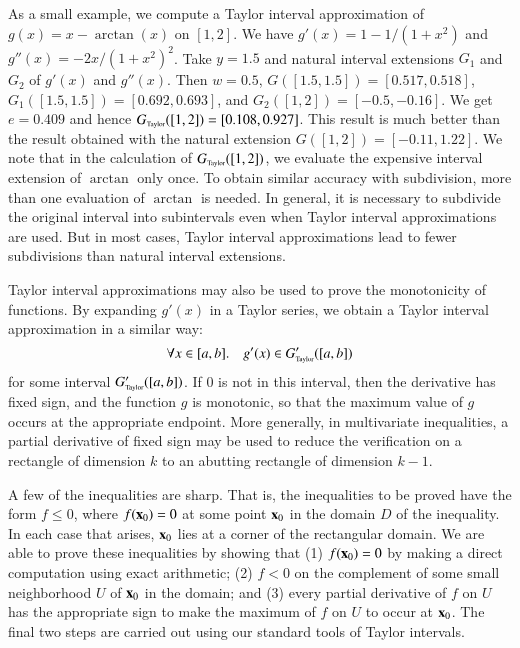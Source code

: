As a small example, we compute a Taylor interval approximation of
$g(x) = x - \arctan(x)$ on $[1,2]$. We have $g'(x) = 1 - {1}/{(1 + x^2)}$ and $g''(x)
= {-2x}/{(1 + x^2)^2}$. Take $y = 1.5$ and natural interval
extensions $G_1$ and $G_2$ of $g'(x)$ and $g''(x)$. Then $w = 0.5$,
$G([1.5,1.5]) = [0.517,0.518]$, $G_1([1.5,1.5]) = [0.692,0.693]$, and
$G_2([1,2]) = [-0.5, -0.16]$. We get $e = 0.409$ and hence $G_{\hbox{\tiny Taylor}}([1,2])
= [0.108, 0.927]$. This result is much better than the result obtained
with the natural extension $G([1,2]) = [-0.11, 1.22]$. 
We note that in the calculation of $G_{\hbox{\tiny Taylor}}([1,2])$, we evaluate the
expensive interval extension of $\arctan$ only once.  To obtain
similar accuracy with subdivision, more than one evaluation of $\arctan$
is needed.  In general, it is necessary to subdivide the original
interval into subintervals even when Taylor interval approximations are
used. But in most cases, Taylor interval approximations lead to fewer
subdivisions than natural interval extensions.

Taylor interval approximations may also be used to
prove the monotonicity of functions.  By expanding $g'(x)$ in a 
Taylor series, we obtain a Taylor interval approximation in a similar way:
\begin{equation*}
\forall x \in [a,b]. \quad g'(x) \in G_{\hbox{\tiny Taylor}}'([a,b])
\end{equation*}
for some interval $G_{\hbox{\tiny Taylor}}'([a,b])$.  If $0$ is not in this interval, then the
derivative has fixed sign, and
the function $g$ is monotonic, so that the maximum value of $g$ occurs
at the appropriate endpoint.  More generally, in multivariate inequalities,
a partial derivative of fixed sign may be used to reduce the verification on a
rectangle of dimension $k$ to an abutting rectangle of dimension $k-1$.

A few of the inequalities are sharp.  That is, the inequalities to be
proved have the form $f \le 0$, where $f({\bf x}_0)=0$ at some point ${\bf x}_0$
in the domain $D$ of the inequality.  In each case that arises, ${\bf x}_0$ lies at a
corner of the rectangular domain.  We are able to prove these
inequalities by showing that (1) $f({\bf x}_0) = 0$ by making a direct
computation using exact arithmetic; (2) $f < 0$ on the complement of
some small neighborhood $U$ of ${\bf x}_0$ in the domain; and (3) every
partial derivative of $f$ on $U$ has the appropriate sign to make the
maximum of $f$ on $U$ to occur at ${\bf x}_0$.  The final two steps are
carried out using our standard tools of Taylor intervals.

